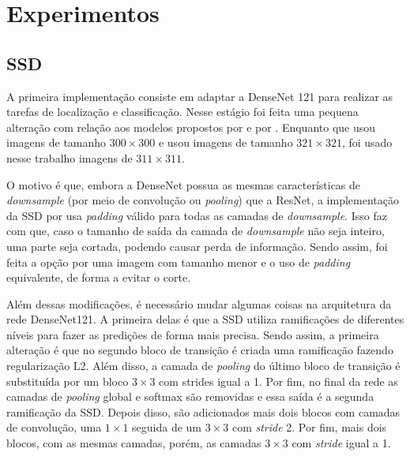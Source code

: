 \chapter{Experimentos}
\label{cap:5}
\vspace{-1.9cm}

\section{SSD}
\label{secao:5:1}

A primeira implementação consiste em adaptar a \ac{DenseNet} 121 para realizar as tarefas de localização e classificação. Nesse estágio foi feita uma pequena alteração com relação aos modelos propostos por  e por . Enquanto que  usou imagens de tamanho $300 \times 300$ e  usou imagens de tamanho $321\times 321$, foi usado nesse trabalho imagens de $311 \times 311$.

O motivo é que, embora a \ac{DenseNet} possua as mesmas características de \textit{downsample} (por meio de convolução ou \textit{pooling}) que a \ac{ResNet}, a implementação da \ac{SSD} por  usa \textit{padding} válido para todas as camadas de \textit{downsample}. Isso faz com que, caso o tamanho de saída da camada de \textit{downsample} não seja inteiro, uma parte seja cortada, podendo causar perda de informação. Sendo assim, foi feita a opção por uma imagem com tamanho menor e o uso de \textit{padding} equivalente, de forma a evitar o corte.

Além dessas modificações, é necessário mudar algumas coisas na arquitetura da rede \ac{DenseNet}121. A primeira delas é que a SSD utiliza ramificações de diferentes níveis para fazer as predições de forma mais precisa. Sendo assim, a primeira alteração é que no segundo bloco de transição é criada uma ramificação fazendo regularização L2. Além disso, a camada de \textit{pooling} do último bloco de transição é substituída por um bloco $3\times3$ com strides igual a 1. Por fim, no final da rede as camadas de \textit{pooling} global e softmax são removidas e essa saída é a segunda ramificação da \ac{SSD}. Depois disso, são adicionados mais dois blocos com camadas de convolução, uma $1\times1$ seguida de um $3\times3$ com \textit{stride} 2. Por fim, mais dois blocos, com as mesmas camadas, porém, as camadas $3\times3$ com \textit{stride} igual a 1.

